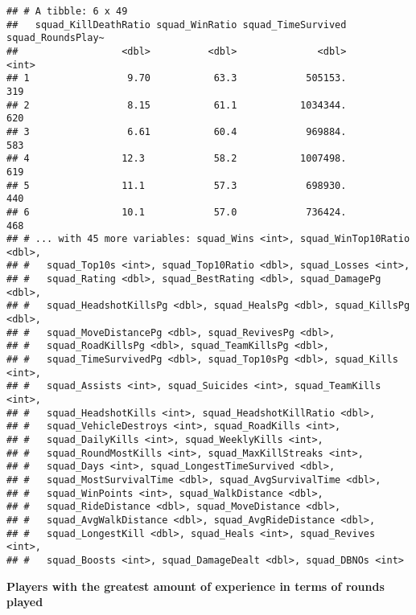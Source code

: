\documentclass[]{article}
\begin{document}
\begin{verbatim}
## # A tibble: 6 x 49
##   squad_KillDeathRatio squad_WinRatio squad_TimeSurvived squad_RoundsPlay~
##                  <dbl>          <dbl>              <dbl>             <int>
## 1                 9.70           63.3            505153.               319
## 2                 8.15           61.1           1034344.               620
## 3                 6.61           60.4            969884.               583
## 4                12.3            58.2           1007498.               619
## 5                11.1            57.3            698930.               440
## 6                10.1            57.0            736424.               468
## # ... with 45 more variables: squad_Wins <int>, squad_WinTop10Ratio <dbl>,
## #   squad_Top10s <int>, squad_Top10Ratio <dbl>, squad_Losses <int>,
## #   squad_Rating <dbl>, squad_BestRating <dbl>, squad_DamagePg <dbl>,
## #   squad_HeadshotKillsPg <dbl>, squad_HealsPg <dbl>, squad_KillsPg <dbl>,
## #   squad_MoveDistancePg <dbl>, squad_RevivesPg <dbl>,
## #   squad_RoadKillsPg <dbl>, squad_TeamKillsPg <dbl>,
## #   squad_TimeSurvivedPg <dbl>, squad_Top10sPg <dbl>, squad_Kills <int>,
## #   squad_Assists <int>, squad_Suicides <int>, squad_TeamKills <int>,
## #   squad_HeadshotKills <int>, squad_HeadshotKillRatio <dbl>,
## #   squad_VehicleDestroys <int>, squad_RoadKills <int>,
## #   squad_DailyKills <int>, squad_WeeklyKills <int>,
## #   squad_RoundMostKills <int>, squad_MaxKillStreaks <int>,
## #   squad_Days <int>, squad_LongestTimeSurvived <dbl>,
## #   squad_MostSurvivalTime <dbl>, squad_AvgSurvivalTime <dbl>,
## #   squad_WinPoints <int>, squad_WalkDistance <dbl>,
## #   squad_RideDistance <dbl>, squad_MoveDistance <dbl>,
## #   squad_AvgWalkDistance <dbl>, squad_AvgRideDistance <dbl>,
## #   squad_LongestKill <dbl>, squad_Heals <int>, squad_Revives <int>,
## #   squad_Boosts <int>, squad_DamageDealt <dbl>, squad_DBNOs <int>
\end{verbatim}

\textbf{Players with the greatest amount of experience in terms of
rounds played}
\end{document}
